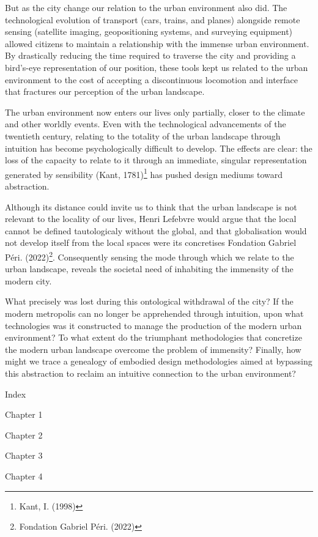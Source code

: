 \documentclass[
  letterpaper,
  DIV=11,
  numbers=noendperiod]{scrreprt}
\begin{document}
But as the city change our relation to the urban environment also did.
The technological evolution of transport (cars, trains, and planes)
alongside remote sensing (satellite imaging, geopositioning systems, and
surveying equipment) allowed citizens to maintain a relationship with
the immense urban environment. By drastically reducing the time required
to traverse the city and providing a bird's-eye representation of our
position, these tools kept us related to the urban environment to the
cost of accepting a discontinuous locomotion and interface that
fractures our perception of the urban landscape.

The urban environment now enters our lives only partially, closer to the
climate and other worldly events. Even with the technological
advancements of the twentieth century, relating to the totality of the
urban landscape through intuition has become psychologically difficult
to develop. The effects are clear: the loss of the capacity to relate to
it through an immediate, singular representation generated by
sensibility (Kant, 1781)\footnote{Kant, I. (1998)} has pushed design
mediums toward abstraction.

Although its distance could invite us to think that the urban landscape
is not relevant to the locality of our lives, Henri Lefebvre would argue
that the local cannot be defined tautologicaly without the global, and
that globalisation would not develop itself from the local spaces were
its concretises Fondation Gabriel Péri. (2022)\footnote{Fondation
  Gabriel Péri. (2022)}. Consequently sensing the mode through which we
relate to the urban landscape, reveals the societal need of inhabiting
the immensity of the modern city.

What precisely was lost during this ontological withdrawal of the city?
If the modern metropolis can no longer be apprehended through intuition,
upon what technologies was it constructed to manage the production of
the modern urban environment? To what extent do the triumphant
methodologies that concretize the modern urban landscape overcome the
problem of immensity? Finally, how might we trace a genealogy of
embodied design methodologies aimed at bypassing this abstraction to
reclaim an intuitive connection to the urban environment?

Index

Chapter 1

Chapter 2

Chapter 3

Chapter 4
\end{document}
